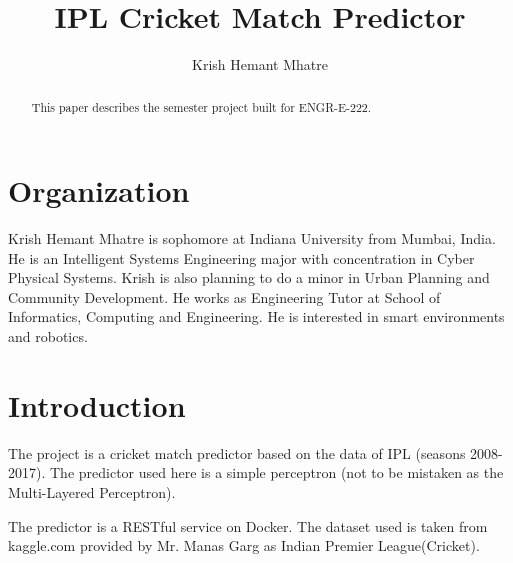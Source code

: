 
\title{IPL Cricket Match Predictor}


\author{Krish Hemant Mhatre}



\renewcommand{\shortauthors}{K. Mhatre}


\begin{abstract}
This paper describes the semester project built for ENGR-E-222.
\end{abstract}



\maketitle

\section{Organization}

Krish Hemant Mhatre is sophomore at Indiana University from Mumbai, India. 
He is an Intelligent Systems Engineering major with concentration in Cyber Physical Systems. 
Krish is also planning to do a minor in Urban Planning and Community Development. 
He works as Engineering Tutor at School of Informatics, Computing and Engineering. 
He is interested in smart environments and robotics.
 

\section{Introduction}

The project is a cricket match predictor based on the data of IPL (seasons 2008-2017). The predictor used here is a simple perceptron (not to be mistaken as the Multi-Layered Perceptron).

The predictor is a RESTful service on Docker.
The dataset used is taken from kaggle.com provided by Mr. Manas Garg as Indian Premier League(Cricket).


